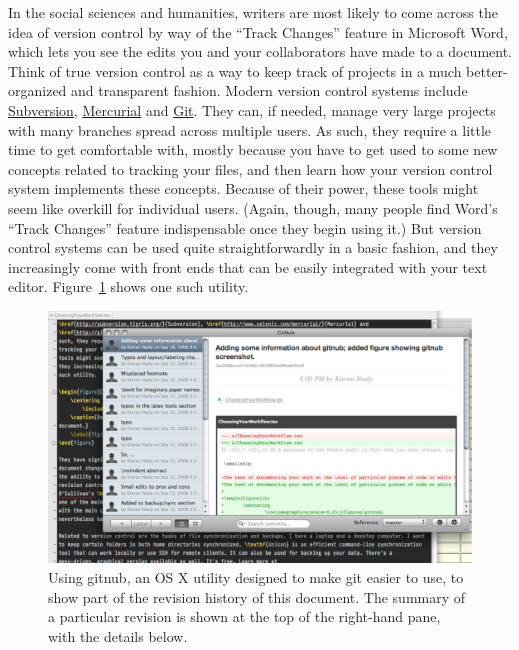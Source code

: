 \documentclass[11pt,article,oneside]{memoir}
\begin{document}
In the social sciences and humanities, writers are most likely to come across the idea of version control by way of the ``Track Changes'' feature in Microsoft Word, which lets you see the edits you and your collaborators have made to a document. Think of true version control as a way to keep track of  projects in a much better-organized and transparent fashion. Modern version control systems include \href{http://subversion.tigris.org/}{Subversion}, \href{http://www.selenic.com/mercurial/}{Mercurial} and \href{http://git.or.cz/}{Git}. They can, if needed, manage very large projects with many branches spread across multiple users. As such, they require a little time to get comfortable with, mostly because you have to get used to some new concepts related to tracking your files, and then learn how your version control system implements these concepts. Because of their power, these tools might seem like overkill for individual users. (Again, though, many people find Word's ``Track Changes'' feature indispensable once they begin using it.) But version control systems can be used quite straightforwardly in a basic fashion, and they increasingly come with front ends that can be easily integrated with your text editor. Figure~\ref{fig:gitnub} shows one such utility.     

\begin{figure}[h]
	\centering
		\includegraphics[scale=0.33]{figures/gitnub}
	\caption{Using gitnub, an OS X utility designed to make git easier to use, to show part of the revision history of this document. The summary of a particular revision is shown at the top of the right-hand pane, with the details below.}
	\label{fig:gitnub}
\end{figure}
\end{document}
